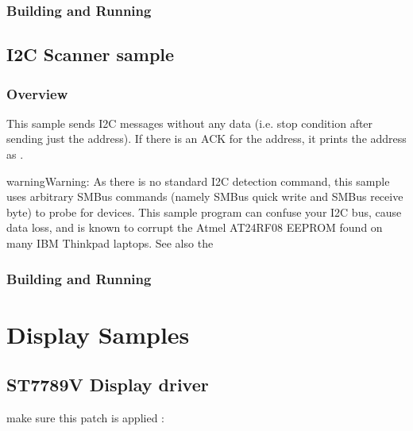 \documentclass[letterpaper,10pt,english]{sphinxmanual}
\begin{document}
\subsubsection{Building and Running}
\label{\detokenize{samples/drivers/ds6_scanner/README:building-and-running}}

\subsection{I2C Scanner sample}
\label{\detokenize{samples/drivers/i2c_scanner/README:i2c-scanner-sample}}\label{\detokenize{samples/drivers/i2c_scanner/README:i2c-scanner}}\label{\detokenize{samples/drivers/i2c_scanner/README::doc}}

\subsubsection{Overview}
\label{\detokenize{samples/drivers/i2c_scanner/README:overview}}
This sample sends I2C messages without any data (i.e. stop condition
after sending just the address). If there is an ACK for the
address, it prints the address as .

\begin{sphinxadmonition}{warning}{Warning:}
As  there  is  no  standard I2C detection command, this sample
uses arbitrary SMBus commands (namely SMBus quick write and SMBus
receive byte) to probe for devices.  This sample program can confuse
your I2C bus, cause data loss, and is known to corrupt
the Atmel AT24RF08 EEPROM found on many IBM Thinkpad laptops.
See also the 
\end{sphinxadmonition}


\subsubsection{Building and Running}
\label{\detokenize{samples/drivers/i2c_scanner/README:building-and-running}}

\section{Display Samples}
\label{\detokenize{samples/display/display:display-samples}}\label{\detokenize{samples/display/display:id1}}\label{\detokenize{samples/display/display::doc}}

\subsection{ST7789V Display driver}
\label{\detokenize{samples/display/st7789v/README:st7789v-display-driver}}\label{\detokenize{samples/display/st7789v/README:st7789v-sample}}\label{\detokenize{samples/display/st7789v/README::doc}}
make sure this patch is applied :
\end{document}

